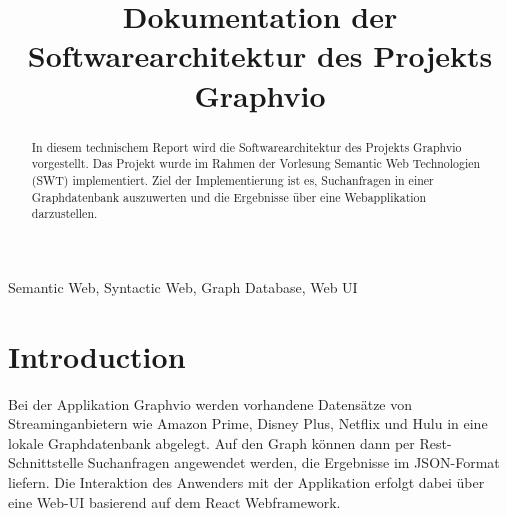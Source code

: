 \documentclass[conference]{IEEEtran}
\begin{document}
\title{Dokumentation der Softwarearchitektur des Projekts Graphvio}


\author{
	\and

	\and

	\and

	\and

}

\maketitle

\begin{abstract}
In diesem technischem Report wird die Softwarearchitektur des Projekts 
Graphvio vorgestellt. Das Projekt wurde im Rahmen der Vorlesung Semantic 
Web Technologien (SWT) implementiert. Ziel der Implementierung ist es, 
Suchanfragen in einer Graphdatenbank auszuwerten und die Ergebnisse 
über eine Webapplikation darzustellen.
\end{abstract}

\begin{IEEEkeywords}
 Semantic Web, Syntactic Web, Graph Database, Web UI
\end{IEEEkeywords}

\section{Introduction}
Bei der Applikation Graphvio werden vorhandene Datensätze von Streaminganbietern wie 
Amazon Prime, Disney Plus, Netflix und Hulu in eine lokale Graphdatenbank abgelegt.
Auf den Graph können dann per Rest-Schnittstelle Suchanfragen angewendet werden, die Ergebnisse
im JSON-Format liefern. Die Interaktion des Anwenders mit der Applikation erfolgt dabei über eine Web-UI basierend auf dem 
React Webframework.
\end{document}
